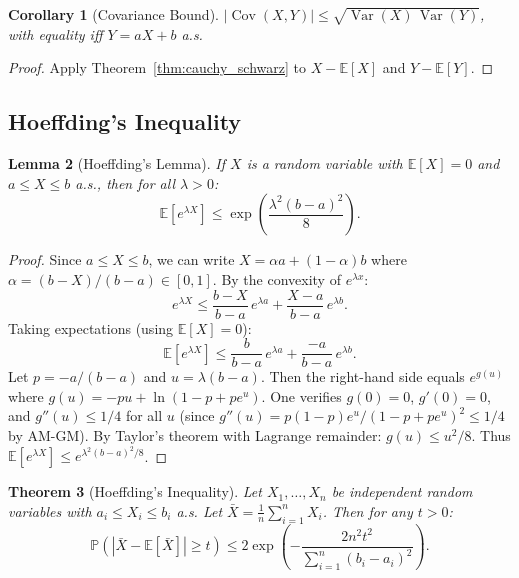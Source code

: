 \documentclass[11pt,a4paper]{article}
\theoremstyle{definition}
\theoremstyle{plain}
\newtheorem{theorem}{Theorem}[section]
\newtheorem{lemma}[theorem]{Lemma}
\newtheorem{corollary}[theorem]{Corollary}
\theoremstyle{remark}
\DeclareMathOperator{\Var}{Var}
\DeclareMathOperator{\Cov}{Cov}
\newcommand{\E}{\mathbb{E}}
\newcommand{\Prob}{\mathbb{P}}
\begin{document}
\begin{corollary}[Covariance Bound]
\label{cor:cov_bound}
$|\Cov(X, Y)| \leq \sqrt{\Var(X)\,\Var(Y)}$, with equality iff $Y = aX + b$ a.s.
\end{corollary}

\begin{proof}
Apply Theorem~\ref{thm:cauchy_schwarz} to $X - \E[X]$ and $Y - \E[Y]$.
\end{proof}

\subsection{Hoeffding's Inequality}
\label{subsec:hoeffding}

\begin{lemma}[Hoeffding's Lemma]
\label{lem:hoeffding}
If $X$ is a random variable with $\E[X] = 0$ and $a \leq X \leq b$ a.s., then for all $\lambda > 0$:
\begin{equation}
    \E[e^{\lambda X}] \leq \exp\!\left(\frac{\lambda^2 (b-a)^2}{8}\right).
    \label{eq:hoeffding_lemma}
\end{equation}
\end{lemma}

\begin{proof}
Since $a \leq X \leq b$, we can write $X = \alpha a + (1-\alpha) b$ where $\alpha = (b - X)/(b - a) \in [0,1]$. By the convexity of $e^{\lambda x}$:
\begin{equation}
    e^{\lambda X} \leq \frac{b - X}{b - a}\, e^{\lambda a} + \frac{X - a}{b - a}\, e^{\lambda b}.
    \label{eq:hoeff_convex}
\end{equation}
Taking expectations (using $\E[X] = 0$):
\begin{equation}
    \E[e^{\lambda X}] \leq \frac{b}{b-a}\, e^{\lambda a} + \frac{-a}{b-a}\, e^{\lambda b}.
\end{equation}
Let $p = -a/(b-a)$ and $u = \lambda(b-a)$. Then the right-hand side equals $e^{g(u)}$ where $g(u) = -pu + \ln(1 - p + p e^u)$. One verifies $g(0) = 0$, $g'(0) = 0$, and $g''(u) \leq 1/4$ for all $u$ (since $g''(u) = p(1-p)e^u/(1-p+pe^u)^2 \leq 1/4$ by AM-GM). By Taylor's theorem with Lagrange remainder: $g(u) \leq u^2/8$. Thus $\E[e^{\lambda X}] \leq e^{\lambda^2(b-a)^2/8}$.
\end{proof}

\begin{keyresult}
\begin{theorem}[Hoeffding's Inequality]
\label{thm:hoeffding}
Let $X_1, \ldots, X_n$ be independent random variables with $a_i \leq X_i \leq b_i$ a.s. Let $\bar{X} = \frac{1}{n}\sum_{i=1}^n X_i$. Then for any $t > 0$:
\begin{equation}
    \Prob\!\left(|\bar{X} - \E[\bar{X}]| \geq t\right) \leq 2\exp\!\left(-\frac{2n^2 t^2}{\sum_{i=1}^n (b_i - a_i)^2}\right).
    \label{eq:hoeffding}
\end{equation}
\end{theorem}
\end{keyresult}
\end{document}

